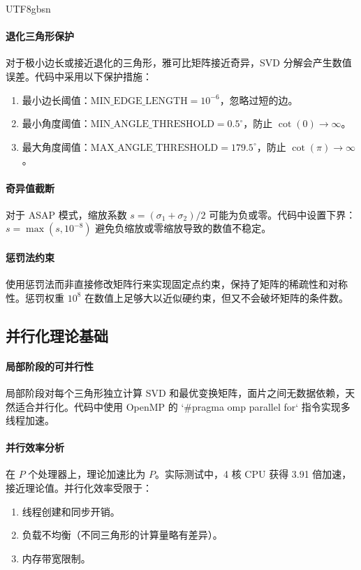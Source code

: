 \documentclass[10pt,a4paper,twocolumn]{article}
\begin{document}
\begin{CJK*}{UTF8}{gbsn}
\paragraph{退化三角形保护}
对于极小边长或接近退化的三角形，雅可比矩阵接近奇异，SVD 分解会产生数值误差。代码中采用以下保护措施：
\begin{enumerate}
\item 最小边长阈值：$\text{MIN\_EDGE\_LENGTH} = 10^{-6}$，忽略过短的边。
\item 最小角度阈值：$\text{MIN\_ANGLE\_THRESHOLD} = 0.5^\circ$，防止 $\cot(0) \to \infty$。
\item 最大角度阈值：$\text{MAX\_ANGLE\_THRESHOLD} = 179.5^\circ$，防止 $\cot(\pi) \to \infty$。
\end{enumerate}

\paragraph{奇异值截断}
对于 ASAP 模式，缩放系数 $s = (\sigma_1 + \sigma_2) / 2$ 可能为负或零。代码中设置下界：
$
s = \max(s, 10^{-8})
$
避免负缩放或零缩放导致的数值不稳定。

\paragraph{惩罚法约束}
使用惩罚法而非直接修改矩阵行来实现固定点约束，保持了矩阵的稀疏性和对称性。惩罚权重 $10^8$ 在数值上足够大以近似硬约束，但又不会破坏矩阵的条件数。

\subsection{并行化理论基础}

\paragraph{局部阶段的可并行性}
局部阶段对每个三角形独立计算 SVD 和最优变换矩阵，面片之间无数据依赖，天然适合并行化。代码中使用 OpenMP 的 `#pragma omp parallel for` 指令实现多线程加速。

\paragraph{并行效率分析}
在 $P$ 个处理器上，理论加速比为 $P$。实际测试中，4 核 CPU 获得 3.91 倍加速，接近理论值。并行化效率受限于：
\begin{enumerate}
\item 线程创建和同步开销。
\item 负载不均衡（不同三角形的计算量略有差异）。
\item 内存带宽限制。
\end{enumerate}


\end{CJK*}
\end{document}
